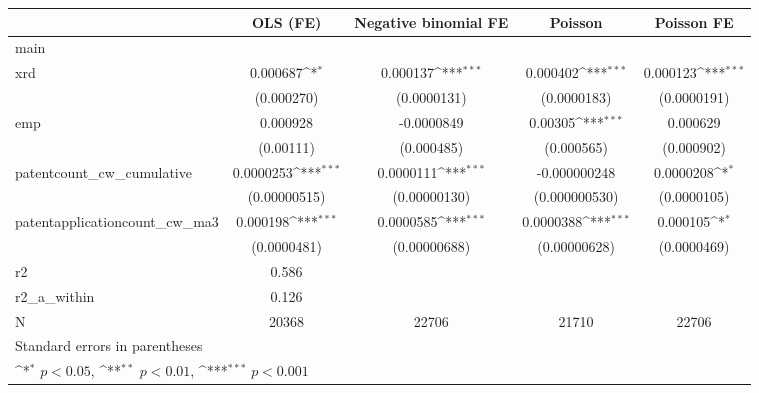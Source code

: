 {
\def\sym#1{\ifmmode^{#1}\else\(^{#1}\)\fi}
\begin{tabular}{l*{4}{c}}
\hline\hline
            &\multicolumn{1}{c}{OLS (FE)}&\multicolumn{1}{c}{Negative binomial FE}&\multicolumn{1}{c}{Poisson}&\multicolumn{1}{c}{Poisson FE}\\
\hline
main        &                     &                     &                     &                     \\
xrd         &    0.000687\sym{*}  &    0.000137\sym{***}&    0.000402\sym{***}&    0.000123\sym{***}\\
            &  (0.000270)         & (0.0000131)         & (0.0000183)         & (0.0000191)         \\
[1em]
emp         &    0.000928         &  -0.0000849         &     0.00305\sym{***}&    0.000629         \\
            &   (0.00111)         &  (0.000485)         &  (0.000565)         &  (0.000902)         \\
[1em]
patentcount\_cw\_cumulative&   0.0000253\sym{***}&   0.0000111\sym{***}&-0.000000248         &   0.0000208\sym{*}  \\
            &(0.00000515)         &(0.00000130)         &(0.000000530)         & (0.0000105)         \\
[1em]
patentapplicationcount\_cw\_ma3&    0.000198\sym{***}&   0.0000585\sym{***}&   0.0000388\sym{***}&    0.000105\sym{*}  \\
            & (0.0000481)         &(0.00000688)         &(0.00000628)         & (0.0000469)         \\
\hline
r2          &       0.586         &                     &                     &                     \\
r2\_a\_within &       0.126         &                     &                     &                     \\
N           &       20368         &       22706         &       21710         &       22706         \\
\hline\hline
\multicolumn{5}{l}{\footnotesize Standard errors in parentheses}\\
\multicolumn{5}{l}{\footnotesize \sym{*} \(p<0.05\), \sym{**} \(p<0.01\), \sym{***} \(p<0.001\)}\\
\end{tabular}
}
